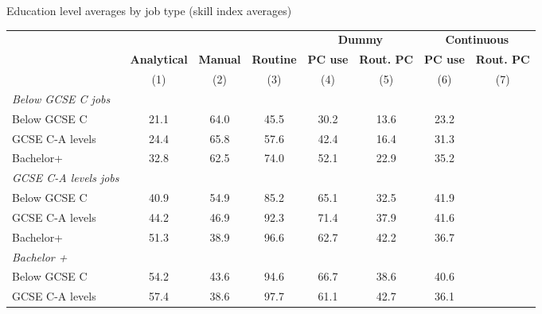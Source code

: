 \begin{center}
\begin{threeparttable}[!h]
\caption{Education level averages by job type (skill index averages)}
\label{tab:skillMeans}
\begin{tabular}{lccccccc}
\toprule
\toprule
& & & &\multicolumn{2}{c}{\textbf{Dummy}}&\multicolumn{2}{c}{\textbf{Continuous}} \\ \cline{5-6} \cline{7-8}
&\multicolumn{1}{c}{\textbf{Analytical}}&\multicolumn{1}{c}{\textbf{Manual}}&\multicolumn{1}{c}{\textbf{Routine}}&\multicolumn{1}{c}{\textbf{PC use}}&\multicolumn{1}{c}{\textbf{Rout. PC}}&\multicolumn{1}{c}{\textbf{PC use}}&\multicolumn{1}{c}{\textbf{Rout. PC}} \\
\textbf{}&\multicolumn{1}{c}{(1)}&\multicolumn{1}{c}{(2)}&\multicolumn{1}{c}{(3)}&\multicolumn{1}{c}{(4)}&\multicolumn{1}{c}{(5)}&\multicolumn{1}{c}{(6)}&\multicolumn{1}{c}{(7)} \\
\midrule
 \textit{Below GCSE C jobs}\\ \midrule 
\hspace{3mm}Below GCSE C&        21.1&        64.0&        45.5&        30.2&        13.6&        23.2\\
\hspace{3mm}GCSE C-A levels&        24.4&        65.8&        57.6&        42.4&        16.4&        31.3\\
\hspace{3mm}Bachelor+&        32.8&        62.5&        74.0&        52.1&        22.9&        35.2\\
\midrule \textit{GCSE C-A levels jobs}\\   \midrule
\hspace{3mm}Below GCSE C&        40.9&        54.9&        85.2&        65.1&        32.5&        41.9\\
\hspace{3mm}GCSE C-A levels&        44.2&        46.9&        92.3&        71.4&        37.9&        41.6\\
\hspace{3mm}Bachelor+&        51.3&        38.9&        96.6&        62.7&        42.2&        36.7\\
\midrule \textit{Bachelor +}\vspace{1mm} \\  \midrule 
\hspace{3mm}Below GCSE C&        54.2&        43.6&        94.6&        66.7&        38.6&        40.6\\
\hspace{3mm}GCSE C-A levels&        57.4&        38.6&        97.7&        61.1&        42.7&        36.1\\

\end{tabular}
\end{threeparttable}
\end{center}
